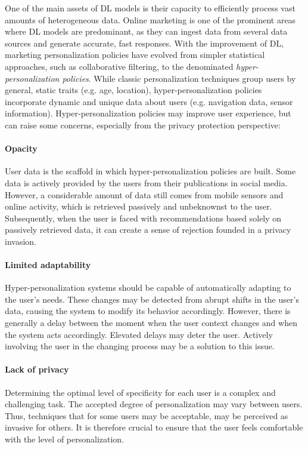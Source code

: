 One of the main assets of DL models is their capacity to efficiently process vast amounts of heterogeneous data. Online marketing is one of the prominent areas where DL models are predominant, as they can ingest data from several data sources and generate accurate, fast responses. With the improvement of DL, marketing personalization policies have evolved from simpler statistical approaches, such as collaborative filtering, to the denominated \textit{hyper-personalization policies}. While classic personalization techniques group users by general, static traits (e.g. age, location), hyper-personalization policies incorporate dynamic and unique data about users (e.g. navigation data, sensor information). Hyper-personalization policies may improve user experience, but can raise some concerns, especially from the privacy protection perspective:
\color{purple}
\paragraph{Opacity}
User data is the scaffold in which hyper-personalization policies are built. Some data is actively provided by the users from their publications in social media. However, a considerable amount of data still comes from mobile sensors and online activity, which is retrieved passively and unbeknownst to the user. Subsequently, when the user is faced with recommendations based solely on passively retrieved data, it can create a sense of rejection founded in a privacy invasion.

\paragraph{Limited adaptability} 
Hyper-personalization systems should be capable of automatically adapting to the user's needs. These changes may be detected from abrupt shifts in the user's data, causing the system to modify its behavior accordingly. However, there is generally a delay between the moment when the user context changes and when the system acts accordingly. Elevated delays may deter the user. Actively involving the user in the changing process may be a solution to this issue.

\paragraph{Lack of privacy}
Determining the optimal level of specificity for each user is a complex and challenging task. The accepted degree of personalization may vary between users. Thus, techniques that for some users may be acceptable, may be perceived as invasive for others. It is therefore crucial to ensure that the user feels comfortable with the level of personalization.

